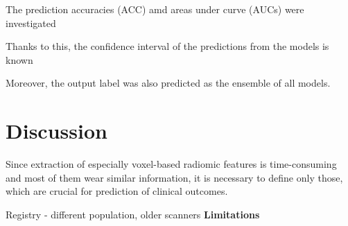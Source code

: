 \documentclass[preprint,12pt]{elsarticle}
\begin{document}
The prediction accuracies (ACC) amd areas under curve (AUCs) were investigated  


Thanks to this, the confidence interval of the predictions from the models is known


Moreover, the output label was also predicted as the ensemble of all models. 






\section{Discussion}



Since extraction of especially voxel-based radiomic features is time-consuming and most of them wear similar information, it is necessary to define only those, which are crucial for prediction of clinical outcomes. 


Registry - different population, older scanners
\textbf{Limitations}










\end{document}

